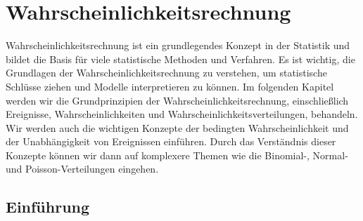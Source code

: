 \chapter{Wahrscheinlichkeitsrechnung}
Wahrscheinlichkeitsrechnung ist ein grundlegendes Konzept in der Statistik und bildet die Basis für viele statistische Methoden und Verfahren.
Es ist wichtig, die Grundlagen der Wahrscheinlichkeitsrechnung zu verstehen, um statistische Schlüsse ziehen und Modelle interpretieren zu können.
Im folgenden Kapitel werden wir die Grundprinzipien der Wahrscheinlichkeitsrechnung, einschließlich Ereignisse, Wahrscheinlichkeiten und Wahrscheinlichkeitsverteilungen, behandeln.
Wir werden auch die wichtigen Konzepte der bedingten Wahrscheinlichkeit und der Unabhängigkeit von Ereignissen einführen.
Durch das Verständnis dieser Konzepte können wir dann auf komplexere Themen wie die Binomial-, Normal- und Poisson-Verteilungen eingehen.


\section{Einführung}

